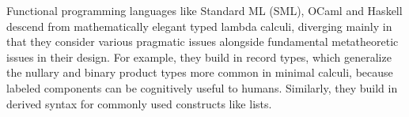 Functional programming languages like Standard ML (SML), OCaml and Haskell descend from mathematically elegant typed lambda calculi, diverging mainly in that they consider various pragmatic issues alongside  fundamental metatheoretic issues in their design.  
For example, they build in record types, which generalize the nullary and binary product types more common in minimal calculi, because labeled components can be cognitively useful to humans. Similarly, they build in derived syntax for commonly used constructs like lists.%

